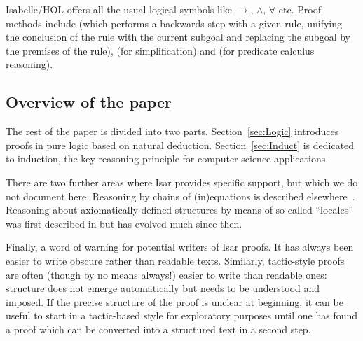 Isabelle/HOL offers all the usual logical symbols like $\longrightarrow$, $\land$,
$\forall$ etc. Proof methods include  (which performs a backwards
step with a given rule, unifying the conclusion of the rule with the
current subgoal and replacing the subgoal by the premises of the
rule),  (for simplification) and  (for predicate
calculus reasoning).

\subsection{Overview of the paper}

The rest of the paper is divided into two parts.
Section~\ref{sec:Logic} introduces proofs in pure logic based on
natural deduction. Section~\ref{sec:Induct} is dedicated to induction,
the key reasoning principle for computer science applications.

There are two further areas where Isar provides specific support, but
which we do not document here. Reasoning by chains of (in)equations is
described elsewhere~\cite{BauerW-TPHOLs01}.  Reasoning about
axiomatically defined structures by means of so called ``locales'' was
first described in \cite{KWP-TPHOLs99} but has evolved much since
then.

Finally, a word of warning for potential writers of Isar proofs.  It
has always been easier to write obscure rather than readable texts.
Similarly, tactic-style proofs are often (though by no means always!)
easier to write than readable ones: structure does not emerge
automatically but needs to be understood and imposed. If the precise
structure of the proof is unclear at beginning, it can be useful to
start in a tactic-based style for exploratory purposes until one has
found a proof which can be converted into a structured text in a
second step.

